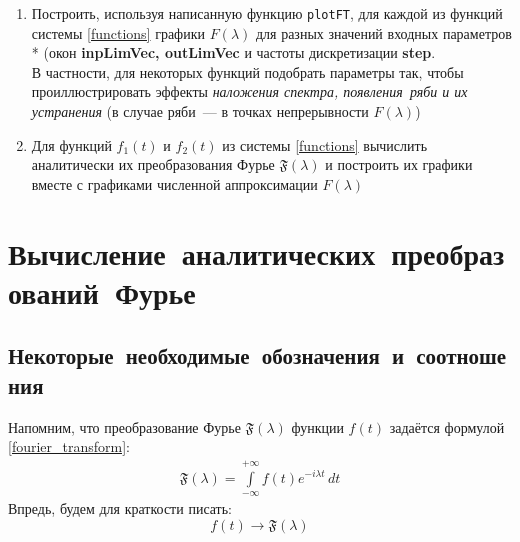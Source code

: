 \documentclass[11pt, oneside, draft]{article}
\numberwithin{equation}{section}
\newcommand \four[1][\lambda]{\mathfrak{F}(#1)}
\newcommand \fft[1][\lambda]{F(#1)}
\newcommand \rarrow{\rightarrow}
\newcommand \intinf[1][{\,dt}]{ \int\limits_{-\infty}^{+\infty}{{#1}}}
\begin{document}
\begin{enumerate}
	\item Построить, используя написанную функцию \texttt{plotFT}, для каждой из функций системы \eqref{functions} графики \(\fft\) для разных значений входных параметров \\*
	(окон \textbf{inpLimVec, outLimVec} и частоты дискретизации \textbf{step}. \\В частности, для некоторых функций подобрать параметры так, чтобы проиллюстрировать
	эффекты \textit{наложения спектра, появления~ряби и их устранения} (в случае ряби~--- в точках непрерывности \(\fft\))
	\item Для функций \(f_1(t)\) и \(f_2(t)\) из системы \eqref{functions} вычислить аналитически их преобразования Фурье \(\four\) и построить их графики вместе с графиками численной
	аппроксимации \(\fft\)
\end{enumerate}

\section{Вычисление~аналитических~преобразований~Фурье}

	\subsection{Некоторые~необходимые~обозначения~и~соотношения}
		Напомним, что преобразование Фурье \( \four \) функции \(f(t)\) задаётся формулой \eqref{fourier_transform}:
			\begin{align*} 
				\four = \intinf[ {f(t) e^{-i\lambda t}\, dt}]
			\end{align*}
		Впредь, будем для краткости писать: 
		\[
			\boxed{ f(t)\rarrow\four}
		\]
		
\end{document}
